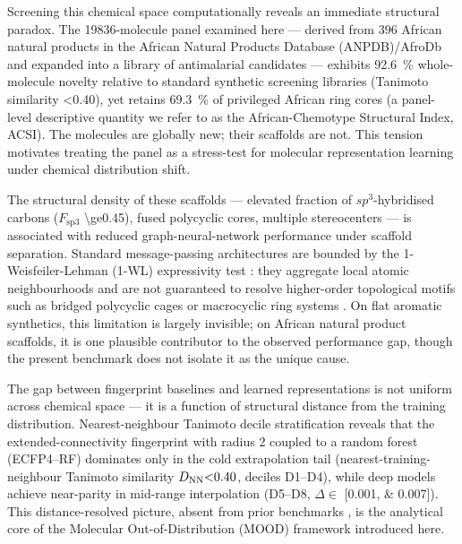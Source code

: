 \documentclass[11pt,a4paper]{article}
\begin{document}
Screening this chemical space computationally reveals an immediate structural paradox. The \num{19836}-molecule panel examined here --- derived from \num{396} African natural products in the African Natural Products Database (ANPDB)/AfroDb \citep{anpdb_2026} and expanded into a library of antimalarial candidates \citep{temgoua2026antimalarial} --- exhibits \qty{92.6}{\percent} whole-molecule novelty relative to standard synthetic screening libraries (Tanimoto similarity \num{<0.40}), yet retains \qty{69.3}{\percent} of privileged African ring cores (a panel-level descriptive quantity we refer to as the African-Chemotype Structural Index, ACSI). The molecules are globally new; their scaffolds are not. This tension motivates treating the panel as a stress-test for molecular representation learning under chemical distribution shift.

The structural density of these scaffolds --- elevated fraction of $sp^3$-hybridised carbons ($F_{\mathrm{sp3}}$ \num{\ge0.45}), fused polycyclic cores, multiple stereocenters --- is associated with reduced graph-neural-network performance under scaffold separation. Standard message-passing architectures are bounded by the 1-Weisfeiler-Lehman (1-WL) expressivity test \citep{xu2019gin,morris2019wlgo,zhang2024beyondwl}: they aggregate local atomic neighbourhoods and are not guaranteed to resolve higher-order topological motifs such as bridged polycyclic cages or macrocyclic ring systems \citep{wieder2020compact}. On flat aromatic synthetics, this limitation is largely invisible; on African natural product scaffolds, it is one plausible contributor to the observed performance gap, though the present benchmark does not isolate it as the unique cause.

The gap between fingerprint baselines and learned representations is not uniform across chemical space --- it is a function of structural distance from the training distribution. Nearest-neighbour Tanimoto decile stratification reveals that the extended-connectivity fingerprint with radius \num{2} coupled to a random forest (ECFP4--RF) dominates only in the cold extrapolation tail (nearest-training-neighbour Tanimoto similarity $D_{\mathrm{NN}}\num{<0.40}$, deciles D1--D4), while deep models achieve near-parity in mid-range interpolation (D5--D8, $\Delta \in$ [\numlist{0.001; 0.007}]). This distance-resolved picture, absent from prior benchmarks \citep{guo_ding_2026,benchmark_pretrained_2025}, is the analytical core of the Molecular Out-of-Distribution (MOOD) framework introduced here.
\end{document}
